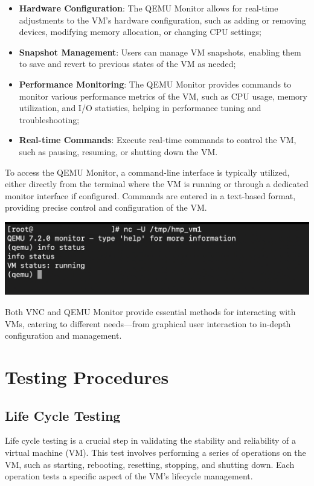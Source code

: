 \begin{itemize}
    \item \textbf{Hardware Configuration}: The QEMU Monitor allows for real-time adjustments to the VM’s hardware configuration, such as adding or removing devices, modifying memory allocation, or changing CPU settings;
    \item \textbf{Snapshot Management}: Users can manage VM snapshots, enabling them to save and revert to previous states of the VM as needed;
    \item \textbf{Performance Monitoring}: The QEMU Monitor provides commands to monitor various performance metrics of the VM, such as CPU usage, memory utilization, and I/O statistics, helping in performance tuning and troubleshooting;
    \item \textbf{Real-time Commands}: Execute real-time commands to control the VM, such as pausing, resuming, or shutting down the VM.
\end{itemize}

To access the QEMU Monitor, a command-line interface is typically utilized, either directly from the terminal where the VM is running or through a dedicated monitor interface if configured. Commands are entered in a text-based format, providing precise control and configuration of the VM.

\begin{center}
    \centering
    \includegraphics[width=\textwidth]{Images/QEMU Monitor.png}
    \label{fig}
\end{center}

Both VNC and QEMU Monitor provide essential methods for interacting with VMs, catering to different needs—from graphical user interaction to in-depth configuration and management.

\section{Testing Procedures}

\subsection{Life Cycle Testing}
Life cycle testing is a crucial step in validating the stability and reliability of a virtual machine (VM). This test involves performing a series of operations on the VM, such as starting, rebooting, resetting, stopping, and shutting down. Each operation tests a specific aspect of the VM's lifecycle management. \mynewline

